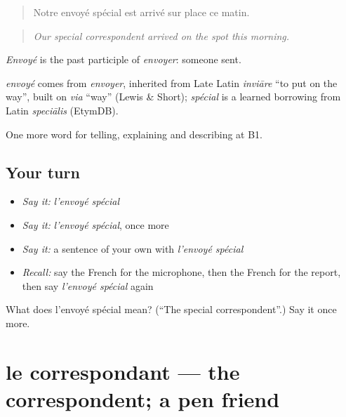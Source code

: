 \begin{quote}
Notre envoyé spécial est arrivé sur place ce matin.
\end{quote}

\begin{quote}
\emph{Our special correspondent arrived on the spot this morning.}
\end{quote}

\emph{Envoyé} is the past participle of \emph{envoyer}: someone sent.

\begin{cousinweb}
\emph{envoyé} comes from \emph{envoyer}, inherited from Late Latin \emph{inviāre} \textquotedblleft{}to put on the way\textquotedblright{}, built on \emph{via} \textquotedblleft{}way\textquotedblright{} (Lewis \& Short); \emph{spécial} is a learned borrowing from Latin \emph{speciālis} (EtymDB).
\end{cousinweb}

\begin{grammarlens}[title={What you've built}]
One more word for telling, explaining and describing at B1.
\end{grammarlens}

\subsection*{Your turn}
\begin{itemize}
\raggedright
  \item \emph{Say it:} \emph{l'envoyé spécial}
  \item \emph{Say it:} \emph{l'envoyé spécial}, once more
  \item \emph{Say it:} a sentence of your own with \emph{l'envoyé spécial}
  \item \emph{Recall:} say the French for the microphone, then the French for the report, then say \emph{l'envoyé spécial} again
\end{itemize}

\begin{tcolorbox}[breakable,colback=teal!4,colframe=teal!35!black,title={Before you move on}]
What does l'envoyé spécial mean? (\textquotedblleft{}The special correspondent\textquotedblright{}.) Say it once more.
\end{tcolorbox}
\section[le correspondant]{le correspondant — the correspondent; a pen friend}

